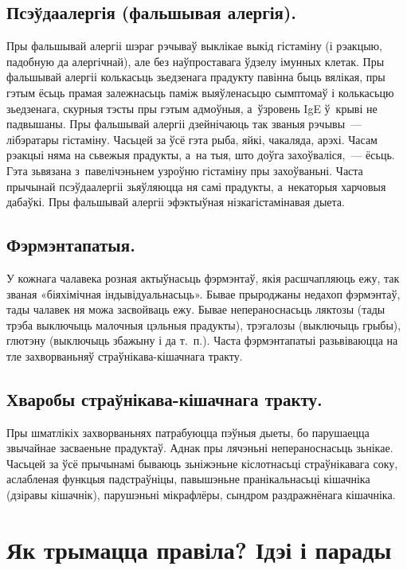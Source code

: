 \subsection{Псэўдаалергія (фальшывая алергія).}
Пры фальшывай алергіі шэраг рэчываў выклікае выкід гістаміну (і рэакцыю, падобную да алергічнай), але без наўпроставага ўдзелу імунных клетак. Пры фальшывай алергіі колькасьць зьедзенага прадукту павінна быць вялікая, пры гэтым ёсьць прамая залежнасьць паміж выяўленасьцю сымптомаў і колькасьцю зьедзенага, скурныя тэсты пры гэтым адмоўныя, а~ўзровень IgE ў~крыві не падвышаны. Пры фальшывай алергіі дзейнічаюць так званыя рэчывы~--- лібэратары гістаміну. Часьцей за ўсё гэта рыба, яйкі, чакаляда, арэхі. Часам рэакцыі няма на сьвежыя прадукты, а~на тыя, што доўга захоўваліся,~--- ёсьць. Гэта зьвязана з~павелічэньнем узроўню гістаміну пры захоўваньні. Часта прычынай псэўдаалергіі зьяўляюцца ня самі прадукты, а~некаторыя харчовыя дабаўкі. Пры фальшывай алергіі эфэктыўная нізкагістамінавая дыета.

\subsection{Фэрмэнтапатыя.}
У кожнага чалавека розная актыўнасьць фэрмэнтаў, якія расшчапляюць ежу, так званая «біяхімічная індывідуальнасьць». Бывае прыроджаны недахоп фэрмэнтаў, тады чалавек ня можа засвойваць ежу. Бывае непераноснасьць ляктозы (тады трэба выключыць малочныя цэльныя прадукты), трэгалозы (выключыць грыбы), глютэну (выключыць збажыну і да т.~п.). Часта фэрмэнтапатыі разьвіваюцца на тле захворваньняў страўнікава-кішачнага тракту.


\subsection{Хваробы страўнікава-кішачнага тракту.}
Пры шматлікіх захворваньнях патрабуюцца пэўныя дыеты, бо парушаецца звычайнае засваеньне прадуктаў. Аднак пры лячэньні непераноснасьць зьнікае. Часьцей за ўсё прычынамі бываюць зьніжэньне кіслотнасьці страўнікавага соку, аслабленая функцыя падстраўніцы, павышэньне пранікальнасьці кішачніка (дзіравы кішачнік), парушэньні мікрафлёры, сындром раздражнёнага кішачніка.

\section{Як трымацца правіла? Ідэі і парады}

